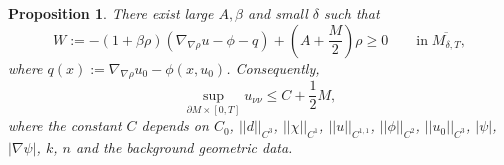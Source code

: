 \documentclass[12pt]{amsart}
\newtheorem{proposition}[theorem]{Proposition}
\theoremstyle{definition}
\theoremstyle{remark}
\numberwithin{equation}{section}
\begin{document}
\begin{proposition}\label{C2_nn_sup_u_nn}
	There exist large $A, \beta$ and small $\delta$ such that
	\begin{equation}
	W := - (1 + \beta \rho) \left( \nabla_{\nabla \rho} u - \phi - q \right) + (A + \frac{M}{2}) \rho \geq 0 \qquad \text{in} \; \overline{M_{\delta, T}},
	\end{equation}
	where $q(x) := \nabla_{\nabla \rho} u_0 - \phi(x, u_0)$. Consequently, 
	\begin{equation}\label{C2_nn_ineq_1}
	\sup_{\partial M \times [0, T]} u_{\nu\nu} \leq C + \frac{1}{2} M,
	\end{equation}
	where the constant $C$ depends on $C_0$, $||d||_{C^3}$, $||\chi||_{C^1}$, $||u||_{C^{1, 1}}$, $||\phi||_{C^2}$, $||u_0||_{C^{3}}$, $|\psi|$, $|\nabla \psi|$, $k$, $n$ and the background geometric data.
\end{proposition}
\end{document}
